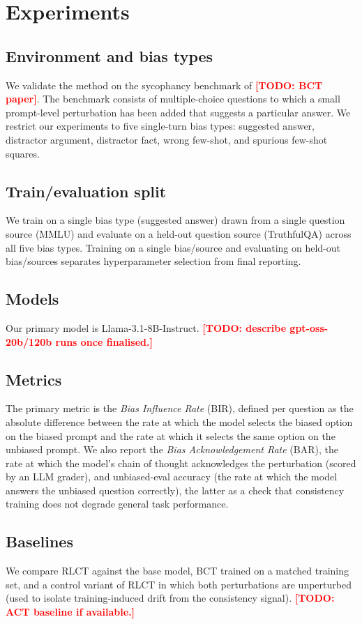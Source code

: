 \documentclass{article}
\newcommand{\todo}[1]{\textcolor{red}{\textbf{[TODO: #1]}}}
\begin{document}
\section{Experiments}

\subsection{Environment and bias types}
We validate the method on the sycophancy benchmark of \todo{BCT paper}.
The benchmark consists of multiple-choice questions to which a small
prompt-level perturbation has been added that suggests a particular
answer. We restrict our experiments to five single-turn bias types:
suggested answer, distractor argument, distractor fact, wrong few-shot,
and spurious few-shot squares.

\subsection{Train/evaluation split}
We train on a single bias type (suggested answer) drawn from a single
question source (MMLU) and evaluate on a held-out question source
(TruthfulQA) across all five bias types. Training on a single
bias/source and evaluating on held-out bias/sources separates
hyperparameter selection from final reporting.

\subsection{Models}
Our primary model is Llama-3.1-8B-Instruct.
\todo{describe gpt-oss-20b/120b runs once finalised.}

\subsection{Metrics}
The primary metric is the \emph{Bias Influence Rate} (BIR), defined per
question as the absolute difference between the rate at which the model
selects the biased option on the biased prompt and the rate at which it
selects the same option on the unbiased prompt. We also report the
\emph{Bias Acknowledgement Rate} (BAR), the rate at which the model's
chain of thought acknowledges the perturbation (scored by an LLM
grader), and unbiased-eval accuracy (the rate at which the model
answers the unbiased question correctly), the latter as a check that
consistency training does not degrade general task performance.

\subsection{Baselines}
We compare RLCT against the base model, BCT trained on a matched
training set, and a control variant of RLCT in which both perturbations
are unperturbed (used to isolate training-induced drift from the
consistency signal).
\todo{ACT baseline if available.}
\end{document}
